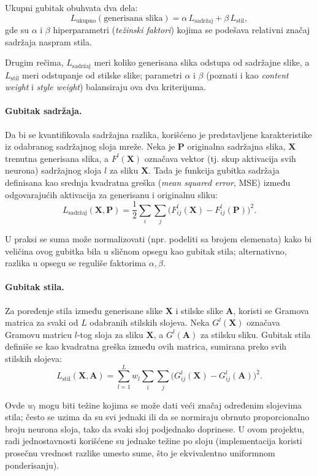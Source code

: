 \documentclass[a4paper,12pt]{article}
\begin{document}
Ukupni gubitak obuhvata dva dela:
\[
L_{\text{ukupno}}(\text{generisana slika}) 
= \alpha \, L_{\text{sadržaj}} + \beta \, L_{\text{stil}},
\]
gde su $\alpha$ i $\beta$ hiperparametri (\emph{težinski faktori}) kojima se podešava relativni značaj sadržaja naspram stila.  

Drugim rečima, $L_{\text{sadržaj}}$ meri koliko generisana slika odstupa od sadržajne slike, a $L_{\text{stil}}$ meri odstupanje od stilske slike; parametri $\alpha$ i $\beta$ (poznati i kao \emph{content weight} i \emph{style weight}) balansiraju ova dva kriterijuma.

\paragraph{Gubitak sadržaja.} 
Da bi se kvantifikovala sadržajna razlika, korišćeno je predstavljene karakteristike iz odabranog sadržajnog sloja mreže. 
Neka je $\mathbf{P}$ originalna sadržajna slika, $\mathbf{X}$ trenutna generisana slika, a $F^l(\mathbf{X})$ označava vektor 
(tj. skup aktivacija svih neurona) sadržajnog sloja $l$ za sliku $\mathbf{X}$. 
Tada je funkcija gubitka sadržaja definisana kao srednja kvadratna greška (\emph{mean squared error}, MSE) između 
odgovarajućih aktivacija za generisanu i originalnu sliku:
\[
L_{\text{sadržaj}}(\mathbf{X}, \mathbf{P}) 
= \frac{1}{2} \sum_i \sum_j \Big( F^l_{ij}(\mathbf{X}) - F^l_{ij}(\mathbf{P}) \Big)^2.
\]

U praksi se suma može normalizovati (npr. podeliti sa brojem elemenata) kako bi veličina ovog gubitka bila u sličnom 
opsegu kao gubitak stila; alternativno, razlika u opsegu se reguliše faktorima $\alpha, \beta$.


\paragraph{Gubitak stila.} 
Za poređenje stila između generisane slike $\mathbf{X}$ i stilske slike $\mathbf{A}$, koristi se Gramova matrica za svaki od $L$ odabranih stilskih slojeva. 
Neka $G^l(\mathbf{X})$ označava Gramovu matricu $l$-tog sloja za sliku $\mathbf{X}$, a $G^l(\mathbf{A})$ za stilsku sliku. 
Gubitak stila definiše se kao kvadratna greška između ovih matrica, sumirana preko svih stilskih slojeva:
\[
L_{\text{stil}}(\mathbf{X}, \mathbf{A}) 
= \sum_{l=1}^{L} w_l \sum_i \sum_j \Big( G^l_{ij}(\mathbf{X}) - G^l_{ij}(\mathbf{A}) \Big)^2.
\]

Ovde $w_l$ mogu biti težine kojima se može dati veći značaj određenim slojevima stila; 
često se uzima da su svi jednaki ili da se normiraju obrnuto proporcionalno broju neurona sloja, 
tako da svaki sloj podjednako doprinese. 
U ovom projektu, radi jednostavnosti korišćene su jednake težine po sloju 
(implementacija koristi prosečnu vrednost razlike umesto sume, što je ekvivalentno uniformnom ponderisanju).
\end{document}
